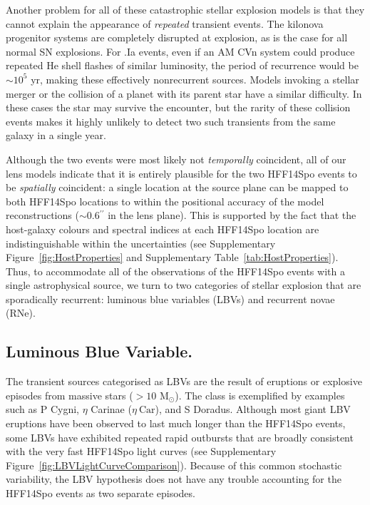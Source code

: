 \documentclass{article}
\def\arcsec{\ensuremath{^{\prime\prime}}\xspace}
\def\Msun{\mbox{M$_{\odot}$}\xspace}
\def\etaCar{\ensuremath{\eta~\mbox{Car}}\xspace}
\def\spock{HFF14Spo\xspace}
\begin{document}
Another problem for all of these catastrophic stellar explosion models
is that they cannot explain the appearance of {\it repeated} transient
events.  The kilonova progenitor systems are completely disrupted at
explosion, as is the case for all normal SN explosions.  For .Ia
events, even if an AM CVn system could produce repeated He shell
flashes of similar luminosity, the period of recurrence would be
$\sim10^5$ yr, making these effectively nonrecurrent sources.  Models
invoking a stellar merger or the collision of a planet with its parent
star have a similar difficulty.  In these cases the star may survive
the encounter, but the rarity of these collision events makes it
highly unlikely to detect two such transients from the same galaxy in
a single year.


Although the two events were most likely not {\it temporally}
coincident, all of our lens models indicate that it is entirely
plausible for the two \spock events to be {\it spatially} coincident:
a single location at the source plane can be mapped to both \spock
locations to within the positional accuracy of the model
reconstructions ($\sim0.6$\arcsec in the lens plane). This is
supported by the fact that the host-galaxy colours and spectral indices
at each \spock location are indistinguishable within the uncertainties
(see Supplementary Figure~\ref{fig:HostProperties} and Supplementary
Table~\ref{tab:HostProperties}).  Thus, to accommodate all of the
observations of the \spock events with a single astrophysical source,
we turn to two categories of stellar explosion that are sporadically
recurrent: luminous blue variables (LBVs) and recurrent novae (RNe).

\subsection{Luminous Blue Variable.}


The transient sources categorised as LBVs are the result of eruptions
or explosive episodes from massive stars ($>10$ \Msun). The class is
exemplified by examples such as P Cygni, $\eta$ Carinae (\etaCar), and
S Doradus\cite{Smith:2011b, Kochanek:2012}.  Although most giant LBV
eruptions have been observed to last much longer than the \spock
events\cite{Smith:2011b}, some LBVs have exhibited repeated rapid
outbursts that are broadly consistent with the very fast \spock light
curves (see Supplementary
Figure~\ref{fig:LBVLightCurveComparison}). Because of this common
stochastic variability, the LBV hypothesis does not have any trouble
accounting for the \spock events as two separate episodes.
\end{document}
